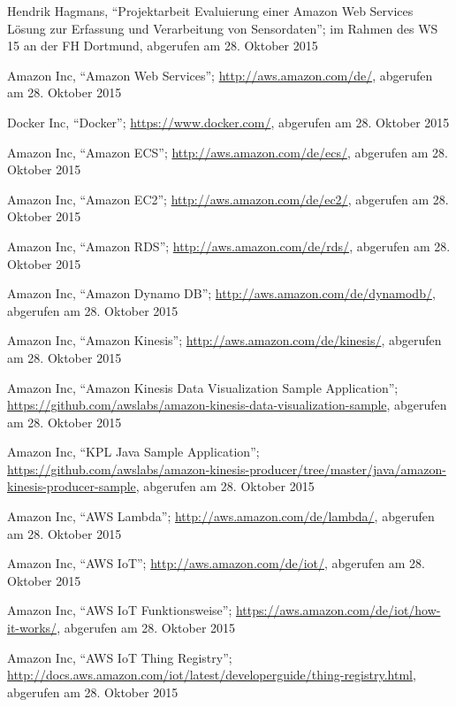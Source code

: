 \begin{thebibliography}{1}


Hendrik Hagmans, ``Projektarbeit Evaluierung einer Amazon Web Services Lösung zur Erfassung und Verarbeitung von Sensordaten''; im Rahmen des WS 15 an der FH Dortmund, abgerufen am 28. Oktober 2015

Amazon Inc, ``Amazon Web Services''; \url{http://aws.amazon.com/de/}, abgerufen am 28. Oktober 2015

Docker Inc, ``Docker''; \url{https://www.docker.com/}, abgerufen am 28. Oktober 2015

Amazon Inc, ``Amazon ECS''; \url{http://aws.amazon.com/de/ecs/}, abgerufen am 28. Oktober 2015

Amazon Inc, ``Amazon EC2''; \url{http://aws.amazon.com/de/ec2/}, abgerufen am 28. Oktober 2015

Amazon Inc, ``Amazon RDS''; \url{http://aws.amazon.com/de/rds/}, abgerufen am 28.
Oktober 2015

Amazon Inc, ``Amazon Dynamo DB''; \url{http://aws.amazon.com/de/dynamodb/}, abgerufen am 28. Oktober 2015

Amazon Inc, ``Amazon Kinesis''; \url{http://aws.amazon.com/de/kinesis/}, abgerufen am 28. Oktober 2015

Amazon Inc, ``Amazon Kinesis Data Visualization Sample Application''; \url{https://github.com/awslabs/amazon-kinesis-data-visualization-sample}, abgerufen am 28. Oktober 2015

Amazon Inc, ``KPL Java Sample Application''; \url{https://github.com/awslabs/amazon-kinesis-producer/tree/master/java/amazon-kinesis-producer-sample}, abgerufen am 28. Oktober 2015

Amazon Inc, ``AWS Lambda''; \url{http://aws.amazon.com/de/lambda/}, abgerufen am 28. Oktober 2015

Amazon Inc, ``AWS IoT''; \url{http://aws.amazon.com/de/iot/}, abgerufen am 28. Oktober 2015


Amazon Inc, ``AWS IoT Funktionsweise''; \url{https://aws.amazon.com/de/iot/how-it-works/}, abgerufen am 28. Oktober 2015

Amazon Inc, ``AWS IoT Thing Registry''; \url{http://docs.aws.amazon.com/iot/latest/developerguide/thing-registry.html}, abgerufen am 28. Oktober 2015


\end{thebibliography}

